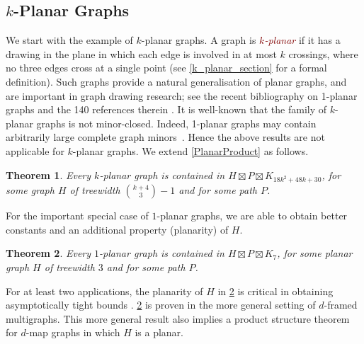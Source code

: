 \documentclass{patmorin}
\theoremstyle{plain}
\newtheorem{thm}{Theorem}
\theoremstyle{definition}
\newcommand{\defin}[1]{\textcolor{Maroon}{\emph{#1}}}
\newcommand{\note}[2]{\noindent{\color{red}[#1:~#2]}}
\begin{document}
\subsection{$k$-Planar Graphs}

We start with the example of $k$-planar graphs. A graph is \defin{$k$-planar} if it has a drawing in the plane in which each edge is involved in at most $k$ crossings, where no three edges cross at a single point (see \cref{k_planar_section} for a formal definition). Such graphs provide a natural generalisation of planar graphs, and are important in graph drawing research; see the recent bibliography on 1-planar graphs and the 140 references therein \citep{kobourov.liotta.ea:annotated}. It is well-known that the family of $k$-planar graphs is not minor-closed.  Indeed, 1-planar graphs may contain arbitrarily large complete graph minors~\citep{dujmovic.eppstein.ea:structure}. Hence the above results are not applicable for  $k$-planar graphs. We extend \cref{PlanarProduct} as follows.

\begin{thm}
\label{kPlanarProduct}
Every $k$-planar graph is contained in $H\boxtimes P\boxtimes K_{18k^2+48k+30}$, for some graph $H$ of treewidth $\binom{k+4}{3}-1$ and for some path $P$.
\end{thm}


For the important special case of $1$-planar graphs, we are able to obtain better constants and an additional property (planarity) of $H$.

\begin{thm}\label{1_planar_product}
  Every $1$-planar graph is contained in $H\boxtimes P\boxtimes K_{7}$, for some planar graph $H$ of treewidth $3$ and for some path $P$.
\end{thm}


For at least two applications, the planarity of $H$ in \cref{1_planar_product} is critical in obtaining asymptotically tight bounds \cite{BDJM,DFMS21}. \cref{1_planar_product} is proven in the more general setting of $d$-framed multigraphs. This more general result also implies a product structure theorem for $d$-map graphs in which $H$ is a planar.
\end{document}
